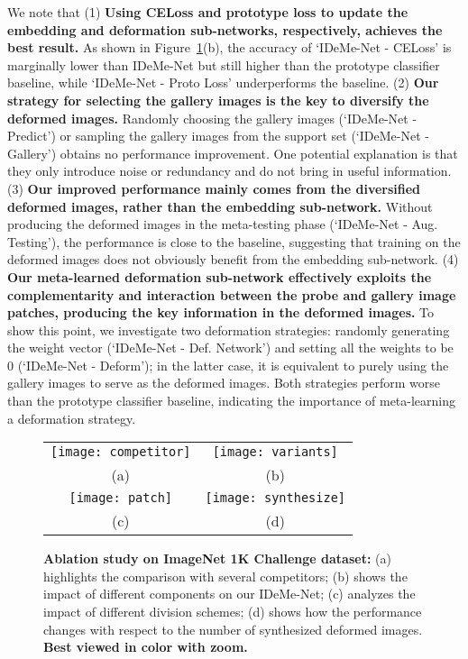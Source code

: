 \documentclass[10pt,letterpaper,twocolumn]{article}
\providecommand{\tabularnewline}{\\}
\begin{document}
We note that (1) \textbf{Using CELoss and prototype loss to update
the embedding and deformation sub-networks, respectively,
achieves the best result.} As shown in Figure~\ref{fig:Ablation}(b),
the accuracy of `IDeMe-Net - CELoss' is marginally lower than IDeMe-Net
but still higher than the prototype classifier baseline, while
`IDeMe-Net - Proto Loss' underperforms the baseline. (2) \textbf{Our
strategy for selecting the gallery images is the key to diversify
the deformed images.} Randomly choosing the gallery
images (`IDeMe-Net - Predict') or sampling
the gallery images from the support set (`IDeMe-Net - Gallery') obtains
no performance improvement. One potential explanation is that they
only introduce noise or redundancy and do not bring in useful information.
(3) \textbf{Our improved performance mainly comes from the diversified deformed
images, rather than the embedding sub-network.} Without producing
the deformed images in the meta-testing phase (`IDeMe-Net - Aug. Testing'),
the performance is close to the baseline, suggesting that training
on the deformed images does not obviously benefit from the embedding
sub-network. (4)
\textbf{Our meta-learned deformation sub-network effectively exploits
the complementarity and interaction between the probe and gallery
image patches, producing the key information in the deformed images.}
To show this point, we investigate two deformation strategies: randomly
generating the weight vector  (`IDeMe-Net - Def. Network') and setting
all the weights to be 0 (`IDeMe-Net - Deform'); in the latter case, it
is equivalent to purely using the gallery images to serve as the deformed
images. Both strategies perform worse than the prototype classifier
baseline, indicating the importance of meta-learning a deformation
strategy.

\begin{figure}
\begin{centering}
\begin{tabular}{cc}
\texttt{[image: competitor]}
  & \texttt{[image: variants]}  \tabularnewline
{\small{}{}(a) }  & {\small{}{}(b) }\tabularnewline
\texttt{[image: patch]}  & \texttt{[image: synthesize]}\tabularnewline
{\small{}{}(c) }  & {\small{}{}(d)}\tabularnewline
\end{tabular}
\par\end{centering}
\vspace{0.1in}
\caption{\textbf{\label{fig:Ablation}Ablation study on ImageNet 1K Challenge
dataset:} (a) highlights the comparison with several competitors;
(b) shows the impact of different components on our IDeMe-Net; (c)
analyzes the impact of different division schemes; (d) shows how the
performance changes with respect to the number of synthesized deformed
images. \textbf{Best viewed in color with zoom. }}

\end{figure}
\end{document}
